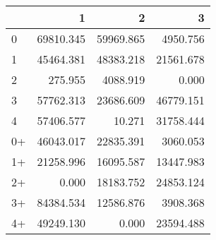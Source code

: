 \begin{tabular}{lrrr}
\toprule
     &         1 &         2 &         3 \\
\midrule
 0   & \num{69810.345} & \num{59969.865} &  \num{4950.756} \\
 1   & \num{45464.381} & \num{48383.218} & \num{21561.678} \\
 2   &   \num{275.955} &  \num{4088.919} &     \num{0.000} \\
 3   & \num{57762.313} & \num{23686.609} & \num{46779.151} \\
 4   & \num{57406.577} &    \num{10.271} & \num{31758.444} \\
 0+  & \num{46043.017} & \num{22835.391} &  \num{3060.053} \\
 1+  & \num{21258.996} & \num{16095.587} & \num{13447.983} \\
 2+  &     \num{0.000} & \num{18183.752} & \num{24853.124} \\
 3+  & \num{84384.534} & \num{12586.876} &  \num{3908.368} \\
 4+  & \num{49249.130} &     \num{0.000} & \num{23594.488} \\
\bottomrule
\end{tabular}